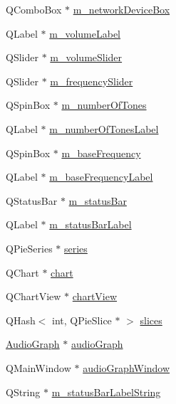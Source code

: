 \begin{DoxyCompactItemize}
\item 
Q\-Combo\-Box $\ast$ \hyperlink{class_audio_test_a9da9104fab5169ae9016993136b22e2e}{m\-\_\-network\-Device\-Box}
\item 
Q\-Label $\ast$ \hyperlink{class_audio_test_a7cc252683f93e389b0783a8b34671665}{m\-\_\-volume\-Label}
\item 
Q\-Slider $\ast$ \hyperlink{class_audio_test_a822b1b9f3ac4cd529e90187f713a0eb8}{m\-\_\-volume\-Slider}
\item 
Q\-Slider $\ast$ \hyperlink{class_audio_test_ab5999227ac75e0ecd7012e331ca36b2f}{m\-\_\-frequency\-Slider}
\item 
Q\-Spin\-Box $\ast$ \hyperlink{class_audio_test_a845de1a2a2a6502d3e62dc6b2a7dae90}{m\-\_\-number\-Of\-Tones}
\item 
Q\-Label $\ast$ \hyperlink{class_audio_test_a8c2e8d20ea6734c144cc2dac5c88a69e}{m\-\_\-number\-Of\-Tones\-Label}
\item 
Q\-Spin\-Box $\ast$ \hyperlink{class_audio_test_a8ba597a8a62383d03f58710261771d4f}{m\-\_\-base\-Frequency}
\item 
Q\-Label $\ast$ \hyperlink{class_audio_test_aab2b89738ef1f45c6e00387a54bdbfba}{m\-\_\-base\-Frequency\-Label}
\item 
Q\-Status\-Bar $\ast$ \hyperlink{class_audio_test_a272651cef1e35ba3dae5bb3adffb5d76}{m\-\_\-status\-Bar}
\item 
Q\-Label $\ast$ \hyperlink{class_audio_test_aaefe5dd3c1527190784ab1bfdc5abb22}{m\-\_\-status\-Bar\-Label}
\item 
Q\-Pie\-Series $\ast$ \hyperlink{class_audio_test_a15e0d2b3243a7fa77753963084e23424}{series}
\item 
Q\-Chart $\ast$ \hyperlink{class_audio_test_acb4bb7befffd173d60885148b403d2fc}{chart}
\item 
Q\-Chart\-View $\ast$ \hyperlink{class_audio_test_ac525335560da38c3d9a945f52d5c664f}{chart\-View}
\item 
Q\-Hash$<$ int, Q\-Pie\-Slice $\ast$ $>$ \hyperlink{class_audio_test_ab57b7deedbfb197745c28092e5c44fe7}{slices}
\item 
\hyperlink{class_audio_graph}{Audio\-Graph} $\ast$ \hyperlink{class_audio_test_a96804bbcebef3ac9a5c2ce73d8ac2847}{audio\-Graph}
\item 
Q\-Main\-Window $\ast$ \hyperlink{class_audio_test_af8f82fce5f5878c15a0c52e72a329f4c}{audio\-Graph\-Window}
\item 
Q\-String $\ast$ \hyperlink{class_audio_test_ac3f219c06b8fc68e769c52a0caba3c4a}{m\-\_\-status\-Bar\-Label\-String}

\end{DoxyCompactItemize}
